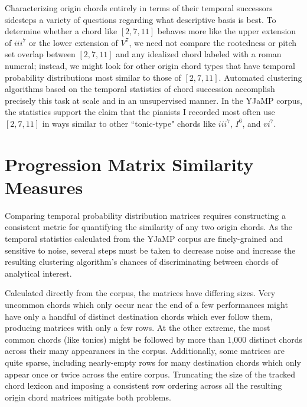 Characterizing origin chords entirely in terms of their temporal successors sidesteps a variety of questions regarding what descriptive basis is best.  To determine whether a chord like $[2,7,11]$ behaves more like the upper extension of $iii^7$ or the lower extension of $V^7$, we need not compare the rootedness or pitch set overlap between $[2,7,11]$ and any idealized chord labeled with a roman numeral; instead, we might look for other origin chord types that have temporal probability distributions most similar to those of $[2,7,11]$.  Automated clustering algorithms based on the temporal statistics of chord succession accomplish precisely this task at scale and in an unsupervised manner.  In the YJaMP corpus, the statistics support the claim that the pianists I recorded most often use $[2,7,11]$ in ways similar to other ``tonic-type" chords like $iii^7$, $I^6$, and $vi^7$.

\section{Progression Matrix Similarity Measures}
Comparing temporal probability distribution matrices requires constructing a consistent metric for quantifying the similarity of any two origin chords.  As the temporal statistics calculated from the YJaMP corpus are finely-grained and sensitive to noise, several steps must be taken to decrease noise and increase the resulting clustering algorithm's chances of discriminating between chords of analytical interest.

Calculated directly from the corpus, the matrices have differing sizes.  Very uncommon chords which only occur near the end of a few performances might have only a handful of distinct destination chords which ever follow them, producing matrices with only a few rows.  At the other extreme, the most common chords (like tonics) might be followed by more than 1,000 distinct chords across their many appearances in the corpus.  Additionally, some matrices are quite sparse, including nearly-empty rows for many destination chords which only appear once or twice across the entire corpus.  Truncating the size of the tracked chord lexicon and imposing a consistent row ordering across all the resulting origin chord matrices mitigate both problems.

